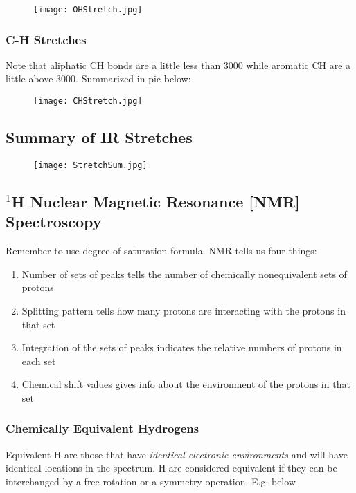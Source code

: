 \documentclass[../OChemReview.tex]{subfiles}
\begin{document}
	\begin{figure}[H]
		\centering
		\texttt{[image: OHStretch.jpg]}
	\end{figure}
	
	\subsubsection{C-H Stretches}
	
	Note that aliphatic CH bonds are a little less than 3000 while aromatic CH are a little above 3000. Summarized in pic below:
	
	\begin{figure}[H]
		\centering
		\texttt{[image: CHStretch.jpg]}
	\end{figure}
	
	\subsection{Summary of IR Stretches}
	
	\begin{figure}[H]
		\centering
		\texttt{[image: StretchSum.jpg]}
	\end{figure}
	
	\subsection{$^{1}$H Nuclear Magnetic Resonance [NMR] Spectroscopy}
	
	Remember to use degree of saturation formula. NMR tells us four things:
	\begin{enumerate}
		\item Number of sets of peaks tells the number of chemically nonequivalent sets of protons
		\item Splitting pattern tells how many protons are interacting with the protons in that set
		\item Integration of the sets of peaks indicates the relative numbers of protons in each set
		\item Chemical shift values gives info about the environment of the protons in that set
	\end{enumerate}
	\newpage
	\subsubsection{Chemically Equivalent Hydrogens}
	
	Equivalent H are those that have \emph{identical electronic environments} and will have identical locations in the spectrum. H are considered equivalent if they can be interchanged by a free rotation or a symmetry operation. E.g. below
	
\end{document}
